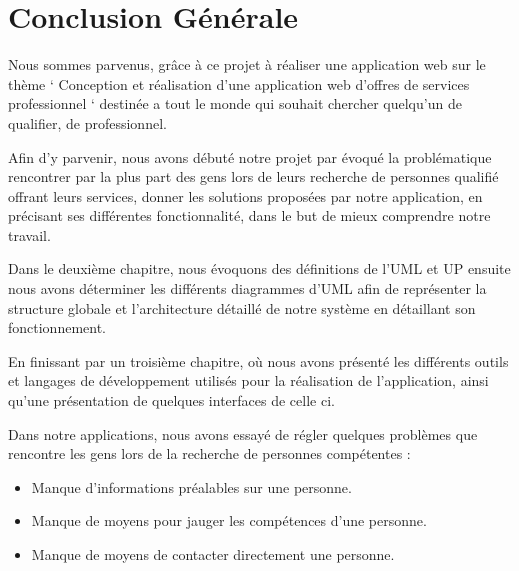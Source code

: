 \documentclass[french]{report}
\begin{document}

\section{Conclusion Générale}

Nous sommes parvenus, grâce à ce projet à réaliser une application web sur le
thème ‘ Conception et réalisation d'une application web d'offres de services
professionnel ‘  destinée a tout le monde qui souhait chercher quelqu'un de
qualifier, de professionnel.

Afin d'y parvenir, nous avons débuté notre projet par évoqué la problématique
rencontrer par la plus part des gens lors de leurs recherche de personnes
qualifié offrant leurs services, donner les solutions proposées par notre
application, en précisant ses différentes fonctionnalité, dans le but de mieux
comprendre notre travail. 

Dans le deuxième chapitre, nous évoquons des définitions de l'UML et UP ensuite
nous avons déterminer les différents diagrammes d'UML afin de représenter la
structure globale et l'architecture détaillé de notre système en détaillant son
fonctionnement.

En finissant par un troisième chapitre, où nous avons présenté les différents
outils et langages de développement utilisés pour la réalisation de
l'application, ainsi qu'une présentation de quelques interfaces de celle ci.
    
Dans notre applications, nous avons essayé de régler quelques problèmes que 
rencontre les gens lors de la recherche de personnes compétentes :

\begin{itemize}
    \item Manque d'informations préalables sur une personne.
    \item Manque de moyens pour jauger les compétences d'une personne.
    \item Manque de moyens de contacter directement une personne.
\end{itemize}

\printbibliography
\end{document}
